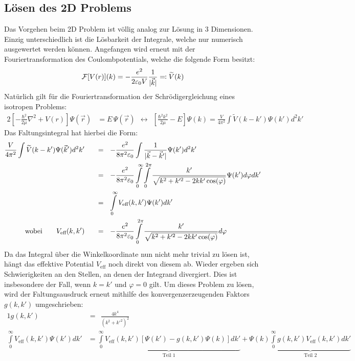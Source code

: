 \subsection{Lösen des 2D Problems}
Das Vorgehen beim 2D Problem ist völlig analog zur Lösung in 3 Dimensionen. Einzig unterschiedlich ist die Lösbarkeit der Integrale, welche nur numerisch ausgewertet werden können. Angefangen wird erneut mit der Fouriertransformation des Coulombpotentials, welche die folgende Form besitzt: 
\begin{alignat*}{1} 
\mathcal{F}[V(r)](k)=-\frac{e^2}{2\varepsilon_0 V}\frac{1}{|\vec{k}|}\eqqcolon \widetilde{V}(k)
\end{alignat*}
Natürlich gilt für die Fouriertransformation der Schrödigergleichung eines isotropen Problems: 
\begin{alignat*}{2}
\left [-\frac{\hbar^2}{2\mu}\nabla ^2 + V(r)\right ]\Psi(\vec{r}) &= E\, \Psi(\vec{r}) \ \ \leftrightarrow \ \ \left [\frac{\hbar^2k^2}{2\mu}-E  \right ]\Psi(k) = \frac{V}{4\pi ^2} \int  \widetilde{V}(k-k')\Psi(k ') d^2 k'
\end{alignat*}
Das Faltungsintegral hat hierbei die Form: 
\begin{alignat*}{2}
\frac{V}{4\pi ^2} \int  \widetilde{V}(k-k')\Psi(\Vk ') d^2 k' 
		&& \ \ &= \ \ -\frac{e^2}{8\pi^2\varepsilon_0} \int  \frac{1}{|\Vk -\Vk '|}\Psi(k ') d^2 k' \\
		&& \ \ &= \ \ -\frac{e^2}{8\pi^2\varepsilon_0} \int\limits_{0}^{\infty}\int\limits_{0}^{2\pi}  \frac{k'}{\sqrt{k^2+k'^2-2kk'\cos(\varphi)}}\Psi(k ') d\varphi dk' \\
		&& \ \ &= \ \ \int\limits_{0}^{\infty}V_\text{eff}(k,k')\Psi(k ') dk' \\
\text{wobei}\qquad V_\text{eff}(k,k') &&  \ \ &= \ \ 		-\frac{e^2}{8\pi^2\varepsilon_0}\int\limits_{0}^{2\pi}  \frac{k'}{\sqrt{k^2+k'^2-2kk'\cos(\varphi)}} d\varphi
\end{alignat*}
Da das Integral über die Winkelkoordinate nun nicht mehr trivial zu lösen ist, hängt das effektive Potential $V_\text{eff}$ noch direkt von diesem ab. Wieder ergeben sich Schwierigkeiten an den Stellen, an denen der Integrand divergiert. Dies ist insbesondere der Fall, wenn $k=k'$ und $\varphi = 0$ gilt. Um dieses Problem zu lösen, wird der Faltungsausdruck erneut mithilfe des konvergenzerzeugenden Faktors $g(k,k')$  umgeschrieben: 
\begin{alignat*}{1}
g(k,k') \ \ &= \ \ \frac{4k^4}{(k^2+k '^2)^2} \\ 
\int\limits_{0}^{\infty}V_\text{eff}(k,k')\Psi(k ') dk' 
&=\underbrace{ \int\limits_{0}^{\infty}V_\text{eff}(k,k')\left [\Psi(k ')-g(k,k')\Psi(k)\right ] dk'}_{\text{Teil 1}} +\Psi(k) 
\underbrace{\int\limits_{0}^{\infty}g(k,k')V_\text{eff}(k,k')dk'}_{\text{Teil 2}}
\end{alignat*}
